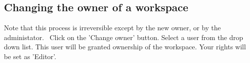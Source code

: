 \documentclass[00_mcda_tutorial.tex]{subfiles}
\begin{document}
\begin{sidebar*}
\subsection*{Changing the owner of a workspace}
\noindent \faExclamationTriangle Note that this process is irreversible except by the new owner, or by the administator.
\leftpointright \, Click on the 'Change owner' button. Select a user from the drop down list. This user will be granted ownership of the workspace. Your rights will be set as 'Editor'.
\newline

\end{sidebar*}
\end{document}
